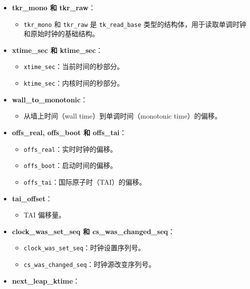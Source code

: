\documentclass[12pt,hyperref,a4paper,UTF8]{ctexart}
\begin{document}
\begin{itemize}
    \item \textbf{tkr\_mono 和 tkr\_raw}：
          \begin{itemize}
              \item \lstinline|tkr_mono| 和 \lstinline|tkr_raw| 是 \lstinline|tk_read_base| 类型的结构体，用于读取单调时钟和原始时钟的基础结构。
          \end{itemize}
    \item \textbf{xtime\_sec 和 ktime\_sec}：
          \begin{itemize}
              \item \lstinline|xtime_sec|：当前时间的秒部分。
              \item \lstinline|ktime_sec|：内核时间的秒部分。
          \end{itemize}
    \item \textbf{wall\_to\_monotonic}：
          \begin{itemize}
              \item 从墙上时间（wall time）到单调时间（monotonic time）的偏移。
          \end{itemize}
    \item \textbf{offs\_real, offs\_boot 和 offs\_tai}：
          \begin{itemize}
              \item \lstinline|offs_real|：实时时钟的偏移。
              \item \lstinline|offs_boot|：启动时间的偏移。
              \item \lstinline|offs_tai|：国际原子时（TAI）的偏移。
          \end{itemize}
    \item \textbf{tai\_offset}：
          \begin{itemize}
              \item TAI 偏移量。
          \end{itemize}
    \item \textbf{clock\_was\_set\_seq 和 cs\_was\_changed\_seq}：
          \begin{itemize}
              \item \lstinline|clock_was_set_seq|：时钟设置序列号。
              \item \lstinline|cs_was_changed_seq|：时钟源改变序列号。
          \end{itemize}
    \item \textbf{next\_leap\_ktime}：
          \begin{itemize}

\end{itemize}
\end{itemize}
\end{document}
